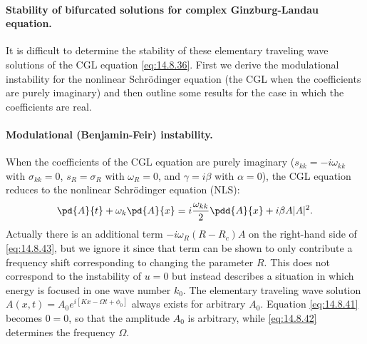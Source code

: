 \paragraph{Stability of bifurcated solutions for complex Ginzburg-Landau equation.}
It is difficult to determine the stability of these elementary traveling wave solutions of the CGL equation \eqref{eq:14.8.36}. First we derive the modulational instability for the nonlinear Schr\"odinger equation (the CGL when the coefficients are purely imaginary) and then outline some results for the case in which the coefficients are real.

\paragraph{Modulational (Benjamin-Feir) instability.}
When the coefficients of the CGL equation are purely imaginary ($s_{kk} = -i\omega_{kk}$ with $\sigma_{kk} = 0$, $s_R = \sigma_R$ with $\omega_R = 0$, and $\gamma = i\beta$ with $\alpha = 0$), the CGL equation reduces to the nonlinear Schr\"odinger equation (NLS):
\begin{equation}
\pd{A}{t} + \omega_k\pd{A}{x} = i\frac{\omega_{kk}}{2}\pdd{A}{x} + i\beta A|A|^2.
\label{eq:14.8.43}
\end{equation}
Actually there is an additional term $-i\omega_R(R - R_c)A$ on the right-hand side of \eqref{eq:14.8.43}, but we ignore it since that term can be shown to only contribute a frequency shift corresponding to changing the parameter $R$. This does not correspond to the instability of $u = 0$ but instead describes a situation in which energy is focused in one wave number $k_0$. The elementary traveling wave solution $A(x,t) = A_0 e^{i[Kx - \Omega t + \phi_0]}$ always exists for arbitrary $A_0$. Equation \eqref{eq:14.8.41} becomes $0 = 0$, so that the amplitude $A_0$ is arbitrary, while \eqref{eq:14.8.42} determines the frequency $\Omega$.

